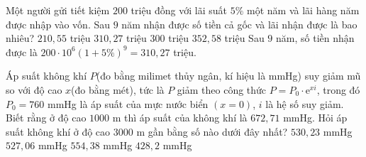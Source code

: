 \begin{ex}
	Một người gửi tiết kiệm $ 200 $ triệu đồng với lãi suất $5 \%$ một năm và lãi hàng năm được nhập vào vốn. Sau $9$ năm nhận được số tiền cả gốc và lãi nhận được là bao nhiêu?
	\choice
	{$210,55$ triệu}
	{\True $310,27$ triệu }
	{$300$ triệu}
	{$352,58$ triệu}
	\loigiai
	{
		Sau $9$ năm, số tiền nhận được là
		$200\cdot 10^6(1+5\%)^9=310,27$ triệu.
	}
\end{ex}

\begin{ex}
	Áp suất không khí $ P $(đo bằng milimet thủy ngân, kí hiệu là mmHg) suy giảm mũ so với độ cao $ x $(đo bằng mét), tức là $ P $ giảm theo công thức $ P=P_0\cdot \text{e}^{xi}$, trong đó $ P_0=760 $ mmHg là áp suất của mực nước biển $(x=0)$, $ i $ là hệ số suy giảm. Biết rằng ở độ cao $ 1000 $ m thì áp suất của không khí là $ 672{,}71 $ mmHg. Hỏi áp suất không khí ở độ cao $ 3000 $ m gần bằng số nào dưới đây nhất?
	\choice
	{$530{,}23 $ mmHg}
	{\True $527{,}06 $ mmHg}
	{$554{,}38 $ mmHg}
	{$428{,}2 $ mmHg}
\end{ex}

